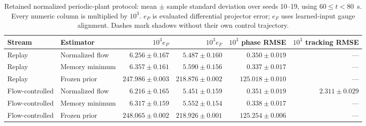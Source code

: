 \begin{table}[t]
\centering
\caption{Retained normalized periodic-plant protocol: mean $\pm$ sample standard deviation over seeds 10--19, using $60\le t<80$~s. Every numeric column is multiplied by $10^3$. $e_P$ is evaluated differential projector error; $e_F$ uses learned-input gauge alignment. Dashes mark shadows without their own control trajectory.}
\label{tab:normalized_fourier_results}
\begin{tabular}{llrrrr}
\toprule
Stream & Estimator & $10^3 e_P$ & $10^3 e_F$ & $10^3$ phase RMSE & $10^3$ tracking RMSE \\
\midrule
Replay & Normalized flow & $6.256\pm0.167$ & $5.487\pm0.160$ & $0.350\pm0.019$ & --- \\
Replay & Memory minimum & $6.357\pm0.161$ & $5.590\pm0.156$ & $0.337\pm0.017$ & --- \\
Replay & Frozen prior & $247.986\pm0.003$ & $218.876\pm0.002$ & $125.018\pm0.010$ & --- \\
Flow-controlled & Normalized flow & $6.216\pm0.165$ & $5.451\pm0.159$ & $0.351\pm0.019$ & $2.311\pm0.029$ \\
Flow-controlled & Memory minimum & $6.317\pm0.159$ & $5.552\pm0.154$ & $0.338\pm0.017$ & --- \\
Flow-controlled & Frozen prior & $248.065\pm0.002$ & $218.926\pm0.001$ & $125.254\pm0.006$ & --- \\
\bottomrule
\end{tabular}
\end{table}
